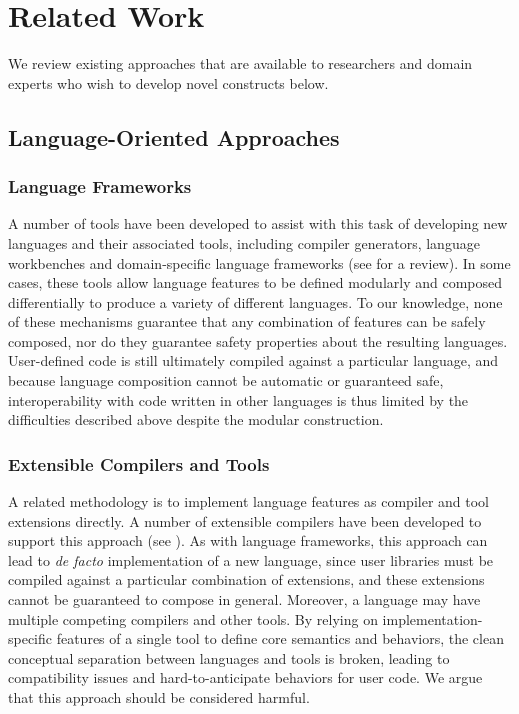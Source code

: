 \section{Related Work}
We review existing approaches that are available to researchers and domain experts who wish to develop novel constructs below.

\subsection{Language-Oriented Approaches}
\subsubsection{Language Frameworks}
A number of tools have been developed to assist with this task of developing new languages and their associated tools, including compiler generators, language workbenches and domain-specific language frameworks (see \cite{fowler2010domain} for a review). In some cases, these tools allow language features to be defined modularly and composed differentially to produce a variety of different languages. To our knowledge, none of these mechanisms guarantee that any combination of features can be safely composed, nor do they guarantee safety properties about the resulting languages. User-defined code is still ultimately compiled against a particular language, and because language composition cannot be automatic or guaranteed safe, interoperability with code written in other languages is thus limited by the difficulties described above despite the modular construction.

\subsubsection{Extensible Compilers and Tools}
A related methodology is to implement language features as compiler and tool extensions directly. A number of extensible compilers have been developed to support this approach (see \cite{clements2008comparison}). As with language frameworks, this approach can lead to \emph{de facto} implementation of a new language, since user libraries must be compiled against a particular combination of extensions, and these extensions cannot be guaranteed to compose in general. Moreover, a language may have multiple competing compilers and other tools. By relying on implementation-specific features of a single tool to define core semantics and behaviors, the clean conceptual separation between languages and tools is broken, leading to compatibility issues and hard-to-anticipate behaviors for user code. We argue that this approach should be considered harmful.

